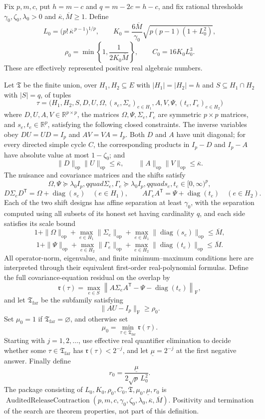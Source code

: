 Fix \(p,m,c\), put \(h=m-c\) and \(q=m-2c=h-c\), and fix rational thresholds \(\gamma _0,\zeta _0,\lambda _0>0\) and \(\overline\kappa,\overline M\geq1\).  Define
\[
 L_0=\bigl(p!\,\overline\kappa^{\,p-1}\bigr)^{1/p},\qquad
 K_0=\frac{6\overline M}{\gamma _0}
 \sqrt{p(p-1)(1+L_0^2)},
\]
\[
 \rho _0=\min\left\{1,\frac{1}{2K_0\overline M}\right\},
 \qquad C_0=16K_0L_0^3.
\]
These are effectively represented positive real algebraic numbers.

Let \(\mathfrak T\) be the finite union, over \(H_1,H_2\subseteq E\) with \(|H_1|=|H_2|=h\) and \(S\subseteq H_1\cap H_2\) with \(|S|=q\), of tuples
\[
 \tau=\bigl(H_1,H_2,S,D,U,\Omega,(s_e,\Sigma_e)_{e\in H_1},
 A,V,\Psi,(t_e,\Gamma_e)_{e\in H_2}\bigr)
\]
where \(D,U,A,V\in\mathbb R^{p\times p}\), the matrices \(\Omega,\Psi,\Sigma_e,\Gamma_e\) are symmetric \(p\times p\) matrices, and \(s_e,t_e\in\mathbb R^p\), satisfying the following closed constraints.  The inverse variables obey \(DU=UD=I_p\) and \(AV=VA=I_p\).  Both \(D\) and \(A\) have unit diagonal; for every directed simple cycle \(C\), the corresponding products in \(I_p-D\) and \(I_p-A\) have absolute value at most \(1-\zeta _0\); and
\[
 \|D\|_{\mathrm{op}}\|U\|_{\mathrm{op}}\leq\overline\kappa,
 \qquad
 \|A\|_{\mathrm{op}}\|V\|_{\mathrm{op}}\leq\overline\kappa.
\]
The nuisance and covariance matrices and the shifts satisfy
\[
 \Omega,\Psi\succeq\lambda _0I_p,qquad
 \Sigma_e,\Gamma_e\succeq\lambda _0I_p,qquad
 s_e,t_e\in[0,\infty)^p,
\]
\[
 D\Sigma_eD^{\mathsf T}=\Omega+\operatorname{diag}(s_e)\quad(e\in H_1),
 \qquad
 A\Gamma_eA^{\mathsf T}=\Psi+\operatorname{diag}(t_e)\quad(e\in H_2).
\]
Each of the two shift designs has affine separation at least \(\gamma _0\), with the separation computed using all subsets of its honest set having cardinality \(q\), and each side satisfies its scale bound
\[
 1+\|\Omega\|_{\mathrm{op}}+
 \max_{e\in H_1}\|\Sigma_e\|_{\mathrm{op}}+
 \max_{e\in H_1}\|\operatorname{diag}(s_e)\|_{\mathrm{op}}\leq\overline M,
\]
\[
 1+\|\Psi\|_{\mathrm{op}}+
 \max_{e\in H_2}\|\Gamma_e\|_{\mathrm{op}}+
 \max_{e\in H_2}\|\operatorname{diag}(t_e)\|_{\mathrm{op}}\leq\overline M.
\]
All operator-norm, eigenvalue, and finite minimum--maximum conditions here are interpreted through their equivalent first-order real-polynomial formulas.  Define the full covariance-equation residual on the overlap by
\[
 \mathfrak r(\tau)=
 \max_{e\in S}
 \left\|A\Sigma_eA^{\mathsf T}-\Psi-\operatorname{diag}(t_e)\right\|_{\mathrm F},
\]
and let \(\mathfrak T_{\mathrm{far}}\) be the subfamily satisfying
\[
 \|AU-I_p\|_{\mathrm F}\geq\rho _0.
\]
Set \(\mu _0=1\) if \(\mathfrak T_{\mathrm{far}}=\varnothing\), and otherwise set
\[
 \mu _0=\min_{\tau\in\mathfrak T_{\mathrm{far}}}\mathfrak r(\tau).
\]
Starting with \(j=1,2,\ldots\), use effective real quantifier elimination to decide whether some \(\tau\in\mathfrak T_{\mathrm{far}}\) has \(\mathfrak r(\tau)<2^{-j}\), and let \(\underline\mu=2^{-j}\) at the first negative answer.  Finally define
\[
 r_0=\frac{\underline\mu}{2\sqrt p\,L_0^2}.
\]
The package consisting of \(L_0,K_0,\rho _0,C_0,\mathfrak T,\mu _0,\underline\mu,r_0\) is \(\operatorname{AuditedReleaseContraction}(p,m,c,\gamma _0,\zeta _0,\lambda _0,\overline\kappa,\overline M)\).  Positivity and termination of the search are theorem properties, not part of this definition.
